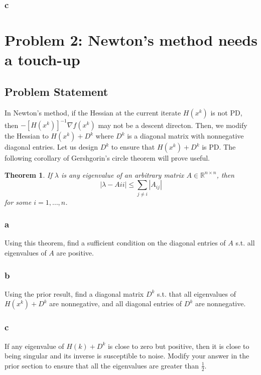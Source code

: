 \documentclass[11pt]{report}
\newtheorem{theorem}{Theorem}[chapter]
\theoremstyle{definition}
\begin{document}
\subsubsection*{c}



\section*{Problem 2: Newton's method needs a touch-up}
\subsection*{Problem Statement}
In Newton's method, if the Hessian at the current iterate $H(x^k)$ is not PD,
then $-[H(x^k)]^{-1}\nabla f(x^k)$ may not be a descent directon. Then, we modify the Hessian to
$H(x^k)+D^k$ where $D^k$ is a diagonal matrix with nonnegative diagonal entries. Let us design
$D^k$ to ensure that $H(x^k)+D^k$ is PD. The following corollary of Gershgorin's circle theorem
will prove useful.

\begin{theorem}
	If $\lambda$ is any eigenvalue of an arbitrary matrix $A\in\mathbb{R}^{n\times n}$, then
	\[|\lambda-A{ii}|\leq\sum_{j\neq i}|A_{ij}|\]
	for some $i=1,\ldots,n$.
\end{theorem}
\subsubsection*{a}
Using this theorem, find a sufficient condition on the diagonal entries of $A$
s.t. all eigenvalues of $A$ are positive.
\subsubsection*{b}
Using the prior result, find a diagonal matrix $D^k$ s.t. that all eigenvalues of $H(x^k)+D^k$
are nonnegative, and all diagonal entries of $D^k$ are nonnegative.
\subsubsection*{c}
If any eigenvalue of $H(k)+D^k$ is close to zero but positive, then it is close
to being singular and its inverse is susceptible to noise. Modify your answer in the prior section to
ensure that all the eigenvalues are greater than $\frac{1}{2}$.
\end{document}
